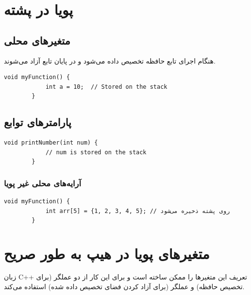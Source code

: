 \documentclass[12pt, a4paper]{report}
\begin{document}
\section{پویا در پشته}

\subsection{متغیر‌های محلی}
هنگام اجرای تابع حافظه تخصیص داده می‌شود و در پایان تابع آزاد می‌‌شوند.



\begin{LTR} %
	\begin{lstlisting}[breaklines=true]
		void myFunction() {
			int a = 10;  // Stored on the stack
		}
	\end{lstlisting}
\end{LTR}


\subsection{پارامتر‌های توابع}


\begin{LTR} %
	\begin{lstlisting}[breaklines=true]
		void printNumber(int num) {
			// num is stored on the stack
		}
	\end{lstlisting}
\end{LTR}

\subsubsection{آرایه‌‌های محلی غیر پویا}
\begin{LTR} %
	\begin{lstlisting}[breaklines=true]
		void myFunction() {
			int arr[5] = {1, 2, 3, 4, 5}; // روی پشته ذخیره می‌شود
		}
	\end{lstlisting}
\end{LTR}


\section{متغیرهای پویا در هیپ به طور صریح}

زبان C++ تعریف این متغیرها را ممکن ساخته است و برای این کار از دو عملگر  (برای تخصیص حافظه) و عملگر  (برای آزاد کردن فضای تخصیص داده‌ شده) استفاده می‌کند.
\end{document}
